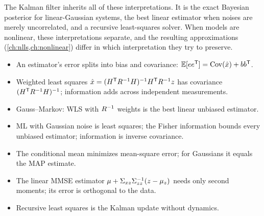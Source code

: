 The Kalman filter inherits all of these interpretations. It is the exact Bayesian posterior for linear-Gaussian systems, the best linear
estimator when noises are merely uncorrelated, and a recursive least-squares solver. When models are nonlinear, these interpretations
separate, and the resulting approximations (\cref{ch:nlls,ch:nonlinear}) differ in which interpretation they try to preserve.

\begin{takeaways}
\begin{itemize}
  \item An estimator's error splits into bias and covariance: $\mathbb{E}[ee^{\mathsf{T}}] = \operatorname{Cov}(\hat x) + bb^{\mathsf{T}}$.
  \item Weighted least squares $\hat x = (H^{\mathsf{T}} R^{-1} H)^{-1} H^{\mathsf{T}} R^{-1} z$ has covariance $(H^{\mathsf{T}} R^{-1} H)^{-1}$; information adds across independent measurements.
  \item Gauss--Markov: WLS with $R^{-1}$ weights is the best linear unbiased estimator.
  \item ML with Gaussian noise is least squares; the Fisher information bounds every unbiased estimator; information is inverse covariance.
  \item The conditional mean minimizes mean-square error; for Gaussians it equals the MAP estimate.
  \item The linear MMSE estimator $\mu + \Sigma_{xz}\Sigma_{zz}^{-1}(z - \mu_z)$ needs only second moments; its error is orthogonal to the data.
  \item Recursive least squares is the Kalman update without dynamics.
\end{itemize}
\end{takeaways}

